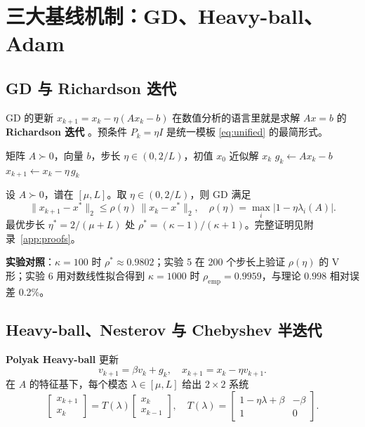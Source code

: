 \section{三大基线机制：GD、Heavy-ball、Adam}
\label{sec:baselines}

\subsection{GD 与 Richardson 迭代}

GD 的更新 $x_{k+1} = x_k - \eta(Ax_k - b)$ 在数值分析的语言里就是求解 $Ax=b$ 的 \textbf{Richardson 迭代} \cite{saad2003}。预条件 $P_k = \eta I$ 是统一模板 \eqref{eq:unified} 的最简形式。

\begin{algorithm}[htbp]
  \caption{梯度下降（Richardson 迭代）}
  \label{alg:gd}
  \begin{algorithmic}[1]
    \Require 矩阵 $A\succ 0$，向量 $b$，步长 $\eta\in(0,2/L)$，初值 $x_0$
    \Ensure 近似解 $x_k$
      \State $g_k \gets A x_k - b$
      \State $x_{k+1} \gets x_k - \eta\, g_k$
    \EndFor
  \end{algorithmic}
\end{algorithm}

\begin{theorem}[GD 在强凸二次上的线性收敛]
\label{thm:gd}
设 $A\succ 0$，谱在 $[\mu, L]$。取 $\eta \in (0, 2/L)$，则 GD 满足
\[
  \|x_{k+1} - x^*\|_2 \le \rho(\eta)\,\|x_k - x^*\|_2,\quad \rho(\eta) = \max_i |1 - \eta \lambda_i(A)|.
\]
最优步长 $\eta^* = 2/(\mu + L)$ 处 $\rho^* = (\kappa - 1)/(\kappa + 1)$。完整证明见附录~\ref{app:proofs}。
\end{theorem}

\textbf{实验对照}：$\kappa = 100$ 时 $\rho^* \approx 0.9802$；实验 5 在 200 个步长上验证 $\rho(\eta)$ 的 V 形；实验 6 用对数线性拟合得到 $\kappa = 1000$ 时 $\rho_{\mathrm{emp}} = 0.9959$，与理论 $0.998$ 相对误差 0.2\%。

\subsection{Heavy-ball、Nesterov 与 Chebyshev 半迭代}

\textbf{Polyak Heavy-ball} 更新
\[
  v_{k+1} = \beta v_k + g_k, \quad x_{k+1} = x_k - \eta v_{k+1}.
\]
在 $A$ 的特征基下，每个模态 $\lambda \in [\mu, L]$ 给出 $2\times 2$ 系统
\[
  \begin{bmatrix} x_{k+1} \\ x_k \end{bmatrix} = T(\lambda) \begin{bmatrix} x_k \\ x_{k-1} \end{bmatrix},\quad
  T(\lambda) = \begin{bmatrix} 1-\eta\lambda+\beta & -\beta \\ 1 & 0 \end{bmatrix}.
\]

